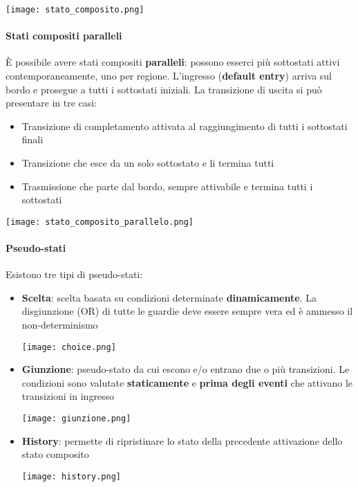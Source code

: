  \begin{center}
 	\texttt{[image: stato\_composito.png]}
 \end{center}
 \newpage
 \paragraph{Stati compositi paralleli}
 È possibile avere stati compositi \textbf{paralleli}: possono esserci più sottostati attivi contemporaneamente, uno per regione. L'ingresso (\textbf{default entry}) arriva sul bordo e prosegue a tutti i sottostati iniziali. La transizione di uscita si può presentare in tre casi:
 \begin{itemize}
 	\item Transizione di completamento attivata al raggiungimento di tutti i sottostati finali
 	\item Transizione che esce da un solo sottostato e li termina tutti
 	\item Trasmissione che parte dal bordo, sempre attivabile e termina tutti i sottostati
 \end{itemize}
 
 \begin{center}
 	\texttt{[image: stato\_composito\_parallelo.png]}
 \end{center}
 
 \paragraph{Pseudo-stati}
 Esistono tre tipi di pseudo-stati:
 \begin{itemize}
 	\item \textbf{Scelta}: scelta basata su condizioni determinate \textbf{dinamicamente}. La disgiunzione (OR) di tutte le guardie deve essere sempre vera ed è ammesso il non-determinismo
 	\begin{center}
 		\texttt{[image: choice.png]}
 	\end{center}
 	\item \textbf{Giunzione}: pseudo-stato da cui escono e/o entrano due o più transizioni. Le condizioni sono valutate \textbf{staticamente} e \textbf{prima degli eventi} che attivano le transizioni in ingresso
 	\begin{center}
 		\texttt{[image: giunzione.png]}
 	\end{center}
 	\item \textbf{History}: permette di ripristinare lo stato della precedente attivazione dello stato composito
 	\begin{center}
 		\texttt{[image: history.png]}
 	\end{center}
 \end{itemize}
 
